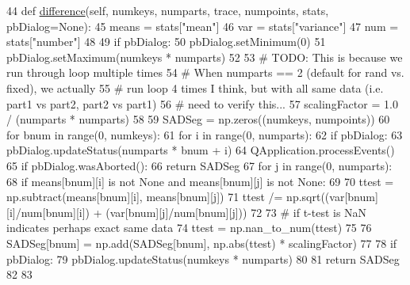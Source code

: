\begin{DoxyCode}
44     \textcolor{keyword}{def }\hyperlink{classsoftware_1_1chipwhisperer_1_1analyzer_1_1utils_1_1TraceExplorerScripts_1_1PartitionDisplay_1_1DifferenceModeTTest_a09a947f1d792c473260189d5531feff7}{difference}(self, numkeys, numparts, trace, numpoints, stats, pbDialog=None):
45         means = stats[\textcolor{stringliteral}{"mean"}]
46         var = stats[\textcolor{stringliteral}{"variance"}]
47         num = stats[\textcolor{stringliteral}{"number"}]
48 
49         \textcolor{keywordflow}{if} pbDialog:
50             pbDialog.setMinimum(0)
51             pbDialog.setMaximum(numkeys * numparts)
52 
53         \textcolor{comment}{# TODO: This is because we run through loop multiple times}
54         \textcolor{comment}{# When numparts == 2 (default for rand vs. fixed), we actually}
55         \textcolor{comment}{# run loop 4 times I think, but with all same data (i.e. part1 vs part2, part2 vs part1)}
56         \textcolor{comment}{# need to verify this...}
57         scalingFactor = 1.0 / (numparts * numparts)
58 
59         SADSeg = np.zeros((numkeys, numpoints))
60         \textcolor{keywordflow}{for} bnum \textcolor{keywordflow}{in} range(0, numkeys):
61             \textcolor{keywordflow}{for} i \textcolor{keywordflow}{in} range(0, numparts):
62                 \textcolor{keywordflow}{if} pbDialog:
63                     pbDialog.updateStatus(numparts * bnum + i)
64                     QApplication.processEvents()
65                     \textcolor{keywordflow}{if} pbDialog.wasAborted():
66                         \textcolor{keywordflow}{return} SADSeg
67                 \textcolor{keywordflow}{for} j \textcolor{keywordflow}{in} range(0, numparts):
68                     \textcolor{keywordflow}{if} means[bnum][i] \textcolor{keywordflow}{is} \textcolor{keywordflow}{not} \textcolor{keywordtype}{None} \textcolor{keywordflow}{and} means[bnum][j] \textcolor{keywordflow}{is} \textcolor{keywordflow}{not} \textcolor{keywordtype}{None}:
69 
70                         ttest = np.subtract(means[bnum][i], means[bnum][j])
71                         ttest /= np.sqrt((var[bnum][i]/num[bnum][i]) + (var[bnum][j]/num[bnum][j]))
72 
73                         \textcolor{comment}{# if t-test is NaN indicates perhaps exact same data}
74                         ttest = np.nan\_to\_num(ttest)
75 
76                         SADSeg[bnum] = np.add(SADSeg[bnum], np.abs(ttest) * scalingFactor)
77 
78         \textcolor{keywordflow}{if} pbDialog:
79             pbDialog.updateStatus(numkeys * numparts)
80 
81         \textcolor{keywordflow}{return} SADSeg
82 
83 
\end{DoxyCode}


